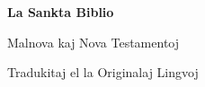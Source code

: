 \begin{center}
\vspace*{\fill}
{\Huge\bfseries La Sankta Biblio}\par\bigskip
{\large Malnova kaj Nova Testamentoj\par
Tradukitaj el la Originalaj Lingvoj}
\vspace*{\fill}
\end{center}
\clearpage
\tableofcontents
\clearpage
